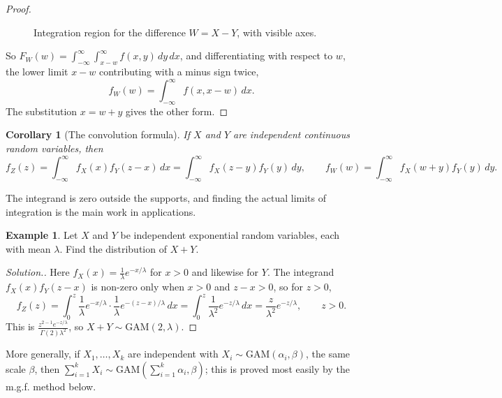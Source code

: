 \documentclass[12pt,a4paper]{report}
\theoremstyle{definition}
\newtheorem{example}[thm]{Example}
\theoremstyle{plain}
\newtheorem{coro}[thm]{Corollary}
\newenvironment{solution}
  {\renewcommand{\qedsymbol}{}\begin{proof}[\textit{Solution}.]}
  {\end{proof}}
\begin{document}
\begin{proof}
\begin{figure}[H]
\caption{Integration region for the difference $W = X - Y$, with visible axes.}
\end{figure}

So $F_W(w) = \int_{-\infty}^\infty\int_{x - w}^\infty f(x,y)\,dy\,dx$, and
differentiating with respect to $w$, the lower limit $x - w$ contributing with a
minus sign twice,
\[f_W(w) = \int_{-\infty}^\infty f(x, x - w)\,dx .\]
The substitution $x = w + y$ gives the other form.
\end{proof}

\begin{coro}[The convolution formula]
\label{cor:convolution}
If $X$ and $Y$ are independent continuous random variables, then
\[f_Z(z) = \int_{-\infty}^\infty f_X(x)f_Y(z-x)\,dx = \int_{-\infty}^\infty
f_X(z-y)f_Y(y)\,dy ,\qquad f_W(w) = \int_{-\infty}^\infty f_X(w + y)f_Y(y)\,dy
.\]
\end{coro}

The integrand is zero outside the supports, and finding the actual limits of
integration is the main work in applications.

\begin{example}
\label{ex:expsum}
Let $X$ and $Y$ be independent exponential random variables, each with mean
$\lambda$. Find the distribution of $X+Y$.
\end{example}

\begin{solution}
Here $f_X(x) = \frac{1}{\lambda}e^{-x/\lambda}$ for $x>0$ and likewise for $Y$.
The integrand $f_X(x)f_Y(z - x)$ is non-zero only when $x>0$ and $z - x>0$, so for
$z>0$,
\[f_Z(z) = \int_0^z \frac{1}{\lambda} e^{-x/\lambda} \cdot \frac{1}{\lambda}
e^{-(z-x)/\lambda}\, dx = \int^z_0 \frac{1}{\lambda^2} e^{-z/\lambda}\, dx =
\frac{z}{\lambda^2} e^{-z/\lambda} ,\qquad z>0 .\]
This is $\frac{z^{2-1}e^{-z/\lambda}}{\Gamma(2)\lambda^2}$, so
$X + Y \sim \text{GAM}(2,\lambda)$.
\end{solution}

More generally, if $X_1,\dots,X_k$ are independent with
$X_i\sim\text{GAM}(\alpha_i,\beta)$, the same scale $\beta$, then
$\sum_{i=1}^kX_i\sim\text{GAM}\left(\sum_{i=1}^k\alpha_i,\beta\right)$; this is
proved most easily by the m.g.f. method below.
\end{document}
